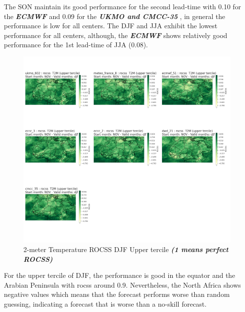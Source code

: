 The SON maintain its good performance for the second lead-time with 0.10 for the \textbf{\textit{ECMWF}} and 0.09 for the \textbf{\textit{UKMO and CMCC-35}} , in general the performance is low for all centers. The DJF and JJA exhibit the lowest performance for all centers, although, the \textbf{\textit{ECMWF}} shows relatively good performance for the 1st lead-time of JJA  (0.08).

\begin{figure}[H]
    \centering
    \includegraphics[width=1\linewidth]{plots/prob/rocss/rocss_djf_t2m_upper.png}
    \caption{2-meter Temperature ROCSS DJF Upper tercile \textbf{\textit{(1 means perfect ROCSS)}}}
\end{figure}

For the upper tercile of DJF, the performance is good in the equator and the Arabian Peninsula with rocss around 0.9. Nevertheless, the North Africa shows negative values which means that the forecast performs worse than random guessing, indicating a forecast that is worse than a no-skill forecast.


